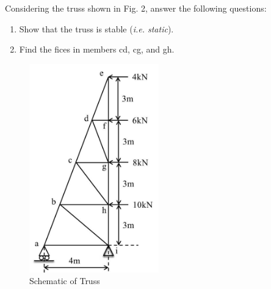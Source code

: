 
Considering the truss shown in Fig. 2, answer the following questions:
\begin{enumerate}
  \item Show that the truss is stable (\textit{i.e. static}).
  \item Find the fices in members cd, cg, and gh.
\end{enumerate}

\begin{figure}[ht!]
  \centering
  \includegraphics[width=0.5\textwidth,
	           height=0.3\textheight,
		   keepaspectratio]{fig.png}
  \caption*{Schematic of Truss}
\end{figure}

